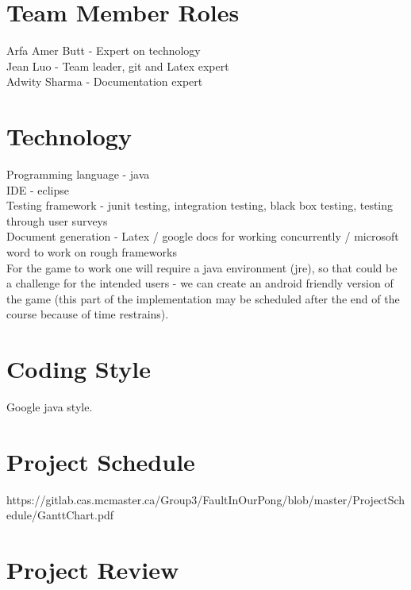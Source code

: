 \documentclass{article}
\begin{document}
\section  {Team Member Roles}

Arfa Amer Butt  - Expert on technology              \\ 
Jean Luo       - Team leader, git and Latex expert \\
Adwity Sharma  -  Documentation expert              \\ 



\section {Technology}
Programming language - java \\
IDE - eclipse\\
Testing framework - junit testing, integration testing, black box testing, testing through user surveys \\
Document generation - Latex / google docs for working concurrently / microsoft word to work on rough frameworks \\
For the game to work one will require a java environment (jre), so that could be a challenge for the intended users - we can create an android friendly version of the game (this part of the implementation may be scheduled after the end of the course because of time restrains). 

\section {Coding Style}
Google java style.

\section {Project Schedule}
https://gitlab.cas.mcmaster.ca/Group3/FaultInOurPong/blob/master/ProjectSchedule/GanttChart.pdf 


\section {Project Review} 
\end{document}
